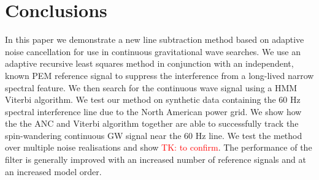 \documentclass[pra,superscriptaddress,reprint,amsmath,amssymb,nofootinbib]{revtex4-2}
\begin{document}




%
%
%

%
%
%
%



\section{Conclusions}
In this paper we demonstrate a new line subtraction method based on adaptive noise cancellation for use in continuous gravitational wave searches. We use an adaptive recursive least squares method in conjunction with an independent, known PEM reference signal to suppress the interference from a long-lived narrow spectral feature. We then search for the continuous wave signal using a HMM Viterbi algorithm. We test our method on synthetic data containing the 60 Hz spectral interference line due to the North American power grid. We show how the the ANC and Viterbi algorithm together are able to successfully track the spin-wandering continuous GW signal near the 60 Hz line. We test the method over multiple noise realisations and show \textcolor{red}{TK: to confirm}. The performance of the filter is generally improved with an increased number of reference signals and at an increased model order. 










%


\newpage 
\newpage 
\end{document}
